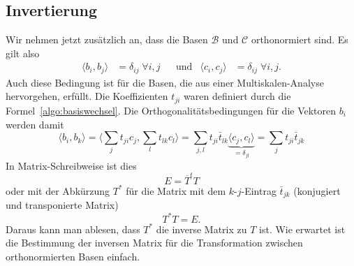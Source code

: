 \subsection{Invertierung}
Wir nehmen jetzt zusätzlich an, dass die Basen $\mathcal{B}$ und $\mathcal{C}$ orthonormiert sind.
Es gilt also
\[
\begin{aligned}
\langle b_i,b_j\rangle &=\delta_{ij}\;\forall i,j
&&\text{und}
&
\langle c_i,c_j\rangle &=\delta_{ij}\;\forall i,j.
\end{aligned}
\]
Auch diese Bedingung ist für die Basen, die aus einer Multiskalen-Analyse hervorgehen, erfüllt.
Die Koeffizienten $t_{ji}$ waren definiert durch die
Formel~\eqref{algo:basiswechsel}.
Die Orthogonalitätsbedingungen für die Vektoren $b_i$ werden damit
\[
\langle b_i,b_k\rangle
=
\biggl\langle
\sum_{j}t_{ji}c_j,\sum_{l}t_{lk}c_l
\biggr\rangle
=
\sum_{j,l} t_{ji}\bar{t}_{lk}
\underbrace{\langle c_j,c_l\rangle}_{\displaystyle=\delta_{jl}}
=
\sum_{j} t_{ji}\bar{t}_{jk}
\]
In Matrix-Schreibweise ist dies
\[
E
=
\overline{T}^tT
\]
oder mit der Abkürzung $T^*$ für die Matrix mit dem $k$-$j$-Eintrag
$\bar{t}_{jk}$ (konjugiert und transponierte Matrix) 
\[
T^*T=E.
\]
Daraus kann man ablesen, dass $T^*$ die inverse Matrix zu $T$ ist.
Wie erwartet ist die Bestimmung der inversen Matrix für die Transformation 
zwischen orthonormierten Basen einfach.

